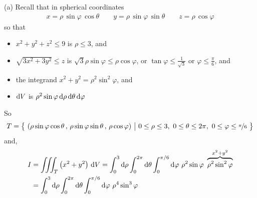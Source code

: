 \begin{solution}
(a)
Recall that in spherical coordinates
\begin{align*}
x=\rho\,\sin\varphi\,\cos\theta\qquad
y=\rho\,\sin\varphi\,\sin\theta\qquad
z=\rho\,\cos\varphi
\end{align*}
so that 
\begin{itemize}
\item
$x^2+y^2+z^2\le 9$ is $\rho\le 3$, and
\item
$\sqrt{3x^2+3y^2}\le z$ is $\sqrt{3}\rho\sin\varphi\le \rho\cos\varphi$,
or $\tan\varphi\le \frac{1}{\sqrt{3}}$ or $\varphi\le\frac{\pi}{6}$, and
\item
the integrand $x^2+y^2=\rho^2\sin^2\varphi$, and
\item
$\mathrm{d}V$ is $\rho^2\sin\varphi\,\mathrm{d}\rho\,\mathrm{d}\theta\,\mathrm{d}\varphi$
\end{itemize}
So
\begin{equation*}
T =\Set{(\rho\sin\varphi\cos\theta\,,\,\rho\sin\varphi\sin\theta\,,\,
          \rho\cos\varphi)}{0\le\rho\le 3,\  0\le\theta\le2\pi,\ 
                            0\le \varphi\le \nicefrac{\pi}{6}}
\end{equation*}
and, 
\begin{align*}
I &=\tripInt_T \big(x^2+y^2\big)\ \dee{V} 
   =\int_0^{3}\dee{\rho}\int_0^{2\pi}\dee{\theta}
           \int_0^{\pi/6}\dee{\varphi}\ \rho^2\sin\varphi\ 
           \overbrace{\rho^2\sin^2\varphi}^{x^2+y^2} \\
   &=\int_0^{3}\dee{\rho}\int_0^{2\pi}\dee{\theta}
           \int_0^{\pi/6}\dee{\varphi}\ \rho^4\sin^3\varphi
\end{align*}


\end{solution}
